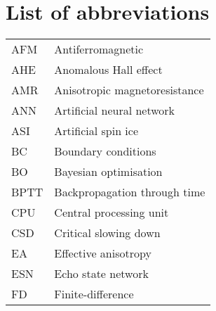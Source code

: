 \chapter{List of abbreviations}
{
    \addtolength{\skip\footins}{1pc}
    \begin{longtable}[l]{ll}
        AFM   & Antiferromagnetic                          \\
        AHE   & Anomalous Hall effect                       \\
        AMR   & Anisotropic magnetoresistance               \\
        ANN   & Artificial neural network                   \\
        ASI   & Artificial spin ice                         \\
        BC    & Boundary conditions                         \\
        BO    & Bayesian optimisation                       \\
        BPTT  & Backpropagation through time                \\
        CPU   & Central processing unit                     \\
        CSD   & Critical slowing down                       \\
        EA    & Effective anisotropy                        \\
        ESN   & Echo state network                          \\
        FD    & Finite-difference                           \\

\end{longtable}}
